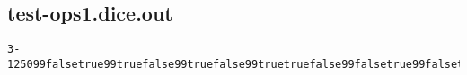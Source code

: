 \subsection{test-ops1.dice.out}
\begin{verbatim}
3-125099falsetrue99truefalse99truefalse99truetruefalse99falsetrue99falsetruetrue
\end{verbatim}
